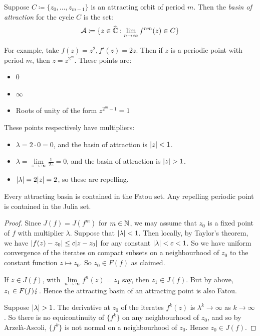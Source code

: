 \documentclass[10pt,a4paper]{article}
\begin{document}
\begin{definition}
  Suppose $C \coloneqq \{z_0, \ldots, z_{m-1}\}$ is an attracting orbit of period $m$. Then the \emph{basin of attraction} for the cycle $C$ is the set:
  \[\mathcal{A} \coloneqq \{z \in \widehat{\mathbb{C}}:\lim_{n\to\infty}f^{nm}(z) \in C\}\]
\end{definition}
For example, take $f(z) = z^2, f'(z) = 2z$. Then if $z$ is a periodic point with period $m$, then $z = z^{2^m}$. These points are:
\begin{itemize}
  \item 0
  \item $\infty$
  \item Roots of unity of the form $z^{2^m-1} = 1$
\end{itemize}
These points respectively have multipliers:
\begin{itemize}
  \item $\lambda = 2\cdot 0=0$, and the basin of attraction is $\lvert z\rvert < 1$.
  \item $\lambda = \lim\limits_{z\to \infty} \frac{1}{2z} = 0$, and the basin of attraction is $\lvert z\rvert > 1$.
  \item $\lvert\lambda\rvert = 2\lvert z\rvert = 2$, so these are repelling.
\end{itemize}
\begin{theorem}
  Every attracting basin is contained in the Fatou set. Any repelling periodic point is contained in the Julia set.
\end{theorem}
\begin{proof}
  Since $J(f) = J(f^m)$ for $m \in \mathbb{N}$, we may assume that $z_0$ is a fixed point of $f$ with multiplier $\lambda$. Suppose that $\lvert\lambda\rvert < 1$. Then locally, by Taylor's theorem, we have $\lvert f(z)-z_0\rvert \leq c\lvert z-z_0\rvert$ for any constant $\lvert\lambda\rvert<c<1$. So we have uniform convergence of the iterates on compact subsets on a neighbourhood of $z_0$ to the constant function $z \mapsto z_0$. So $z_0 \in F(f)$ as claimed.

  If $z \in J(f)$, with $\lim\limits_{n\to\infty} f^n(z) = z_1$ say, then $z_1 \in J(f)$. But by above, $z_1 \in F(f)\lightning$. Hence the attracting basin of an attracting point is also Fatou.

  Suppose $\lvert\lambda\rvert > 1$. The derivative at $z_0$ of the iterates $f^k(z)$ is $\lambda^k \to \infty$ as $k \to \infty$. So there is no equicontinuity of $\{f^k\}$ on any neighbourhood of $z_0$, and so by Arzel\`a-Ascoli, $\{f^k\}$ is not normal on a neighbourhood of $z_0$. Hence $z_0 \in J(f)$.
\end{proof}
\end{document}
